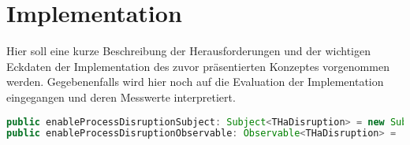 \chapter{Implementation}\label{chap:implementation}

Hier soll eine kurze Beschreibung der Herausforderungen und der wichtigen Eckdaten der Implementation des zuvor präsentierten Konzeptes vorgenommen werden. Gegebenenfalls wird hier noch auf die Evaluation der Implementation eingegangen und deren Messwerte interpretiert.
\begin{lstlisting}[language=java, numbers=none, caption=Exemplarisches Beobachter-Muster]
public enableProcessDisruptionSubject: Subject<THaDisruption> = new Subject();  
public enableProcessDisruptionObservable: Observable<THaDisruption> = 		  this.enableProcessDisruptionSubject.asObservable(); 
\end{lstlisting}
